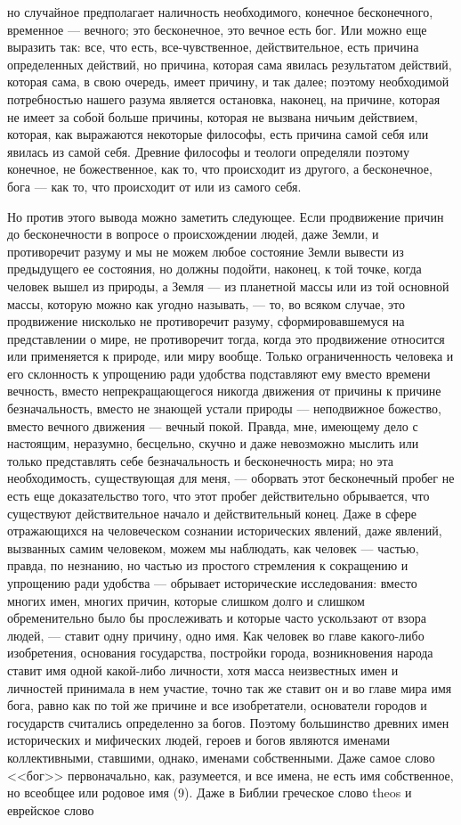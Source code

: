 \documentclass[12pt]{article}
\begin{document}
но случайное предполагает наличность необходимого, конечное бесконечного, временное --- вечного; это бесконечное, это вечное есть бог. Или можно еще выразить так: все, что есть, все-чувственное, действительное, есть причина определенных действий, но причина, которая сама явилась результатом действий, которая сама, в свою очередь, имеет причину, и так далее; поэтому необходимой потребностью нашего разума является остановка, наконец, на причине, которая не имеет за собой больше причины, которая не вызвана ничьим действием, которая, как выражаются некоторые философы, есть причина самой себя или явилась из самой себя. Древние философы и теологи определяли поэтому конечное, не божественное, как то, что происходит из другого, а бесконечное, бога --- как то, что происходит от или из самого себя. 

Но против этого вывода можно заметить следующее. Если продвижение причин до бесконечности в вопросе о происхождении людей, даже Земли, и противоречит разуму и мы не можем любое состояние Земли вывести из предыдущего ее состояния, но должны подойти, наконец, к той точке, когда человек вышел из природы, а Земля --- из планетной массы или из той основной массы, которую можно как угодно называть, --- то, во всяком случае, это продвижение нисколько не противоречит разуму, сформировавшемуся на представлении о мире, не противоречит тогда, когда это продвижение относится или применяется к природе, или миру вообще. Только ограниченность человека и его склонность к упрощению ради удобства подставляют ему вместо времени вечность, вместо непрекращающегося никогда движения от причины к причине безначальность, вместо не знающей устали природы --- неподвижное божество, вместо вечного движения --- вечный покой. Правда, мне, имеющему дело с настоящим, неразумно, бесцельно, скучно и даже невозможно мыслить или только представлять себе безначальность и бесконечность мира; но эта необходимость, существующая для меня, --- оборвать этот бесконечный пробег не есть еще доказательство того, что этот пробег действительно обрывается, что существуют действительное начало и действительный конец. Даже в сфере отражающихся на человеческом сознании исторических явлений, даже явлений, вызванных самим человеком, можем мы наблюдать, как человек --- частью, правда, по незнанию, но частью из простого стремления к сокращению и упрощению ради удобства --- обрывает исторические исследования: вместо многих имен, многих причин, которые слишком долго и слишком обременительно было бы прослеживать и которые часто ускользают от взора людей, --- ставит одну причину, одно имя. Как человек во главе какого-либо изобретения, основания государства, постройки города, возникновения народа ставит имя одной какой-либо личности, хотя масса неизвестных имен и личностей принимала в нем участие, точно так же ставит он и во главе мира имя бога, равно как по той же причине и все изобретатели, основатели городов и государств считались определенно за богов. Поэтому большинство древних имен исторических и мифических людей, героев и богов являются именами коллективными, ставшими, однако, именами собственными. Даже самое слово <<бог>> первоначально, как, разумеется, и все имена, не есть имя собственное, но всеобщее или родовое имя (9). Даже в Библии греческое слово theos и еврейское слово 
\end{document}
